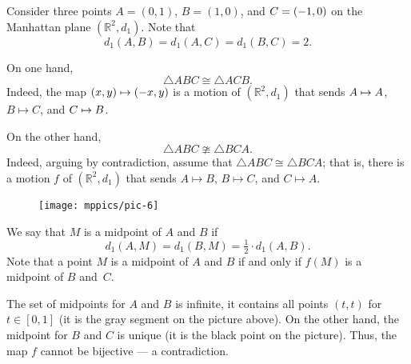 \label{example:isometric but not congruent} Consider three points 
$A=(0,1)$, $B=(1,0)$, and $C\z=(-1,0)$ on the Manhattan plane $(\mathbb{R}^2,d_1)$.
Note that
$$d_1(A,B)=d_1(A,C)=d_1(B,C)=2.$$

On one hand,
$$\triangle ABC\cong \triangle ACB.$$
Indeed, the map $(x,y)\z\mapsto (-x,y)$ is a motion of $(\mathbb{R}^2,d_1)$
that sends $A\z\mapsto A$, $B\mapsto C$, and $C\z\mapsto B$.

On the other hand,
$$\triangle ABC\ncong \triangle BCA.$$
Indeed, arguing by contradiction, assume that $\triangle ABC\cong \triangle BCA$; that is, there is a motion $f$ of $(\mathbb{R}^2,d_1)$ that sends $A\mapsto B$, $B\mapsto C$, and $C\mapsto A$.

\begin{wrapfigure}[6]{o}{33mm}
\vskip-5mm
\centering
\texttt{[image: mppics/pic-6]}
\end{wrapfigure}

We say that $M$ is a midpoint of $A$ and $B$ if 
\[d_1(A,M)=d_1(B,M)=\tfrac12\cdot d_1(A,B).\]
Note that a point $M$ is a midpoint of $A$ and $B$ if and only if $f(M)$ is a midpoint of $B$ and~$C$.

The set of midpoints for $A$ and $B$ is infinite, it contains all points $(t,t)$ for $t\in[0,1]$ (it is the gray segment on the picture above).
On the other hand, the midpoint for $B$ and $C$ is unique (it is the black point on the picture).
Thus, the map $f$ cannot be bijective --- a contradiction.
